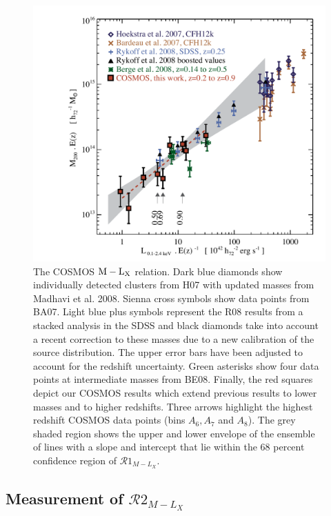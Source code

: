 \documentclass[12pt]{emulateapj}
\newcommand{\mlx}{$\rm{M} - \rm{L}_{\rm X}$ }
\begin{document}
\begin{figure}[htb]
\centerline{\includegraphics[scale=0.75]{figure6.pdf}}
\caption{The COSMOS \mlx relation. Dark blue diamonds show
  individually detected clusters from H07 with updated masses from
  Madhavi et al. 2008. Sienna cross symbols show data points from
  BA07. Light blue plus symbols represent the R08 results from a
  stacked analysis in the SDSS and black diamonds take into account a
  recent correction to these masses due to a new calibration of the
  source distribution. The upper error bars have been adjusted to
  account for the redshift uncertainty. Green asterisks show four data
  points at intermediate masses from BE08. Finally, the red squares
  depict our COSMOS results which extend previous results to lower
  masses and to higher redshifts. Three arrows highlight the highest
  redshift COSMOS data points (bins $A_6, A_7$ and $A_8$). The grey
  shaded region shows the upper and lower envelope of the ensemble of
  lines with a slope and intercept that lie within the 68 percent
  confidence region of $\mathcal{R}1_{M-L_{X}}$.}
\label{lx_m}
\end{figure}

\subsection{Measurement of  $\mathcal{R}2_{M-L_{X}}$}\label{lxm_relation2}
\end{document}
